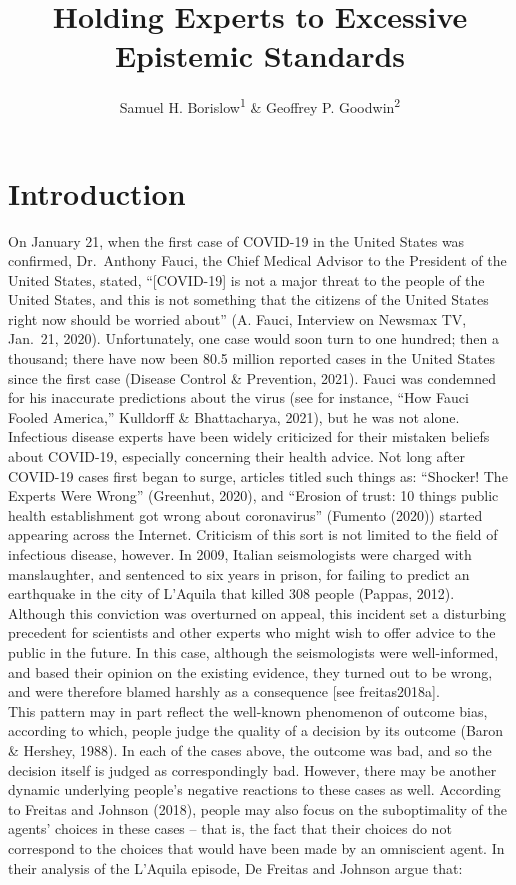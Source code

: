 \documentclass[
  man,floatsintext]{apa6}
\title{Holding Experts to Excessive Epistemic Standards}
\author{Samuel H. Borislow\textsuperscript{1} \& Geoffrey P. Goodwin\textsuperscript{2}}
\date{}
\affiliation{\vspace{0.5cm}\textsuperscript{1} University of Chicago\\\textsuperscript{2} University of Pennsylvania}
\begin{document}
\maketitle

\setlength{\skip\footins}{18pt}

\hypertarget{introduction}{%
\section{Introduction}\label{introduction}}

On January 21, when the first case of COVID-19 in the United States was confirmed, Dr.~Anthony Fauci, the Chief Medical Advisor to the President of the United States, stated, ``{[}COVID-19{]} is not a major threat to the people of the United States, and this is not something that the citizens of the United States right now should be worried about'' (A. Fauci, Interview on Newsmax TV, Jan.~21, 2020). Unfortunately, one case would soon turn to one hundred; then a thousand; there have now been 80.5 million reported cases in the United States since the first case (Disease Control \& Prevention, 2021). Fauci was condemned for his inaccurate predictions about the virus (see for instance, ``How Fauci Fooled America,'' Kulldorff \& Bhattacharya, 2021), but he was not alone. Infectious disease experts have been widely criticized for their mistaken beliefs about COVID-19, especially concerning their health advice. Not long after COVID-19 cases first began to surge, articles titled such things as: ``Shocker! The Experts Were Wrong'' (Greenhut, 2020), and ``Erosion of trust: 10 things public health establishment got wrong about coronavirus'' (Fumento (2020)) started appearing across the Internet. Criticism of this sort is not limited to the field of infectious disease, however. In 2009, Italian seismologists were charged with manslaughter, and sentenced to six years in prison, for failing to predict an earthquake in the city of L'Aquila that killed 308 people (Pappas, 2012). Although this conviction was overturned on appeal, this incident set a disturbing precedent for scientists and other experts who might wish to offer advice to the public in the future. In this case, although the seismologists were well-informed, and based their opinion on the existing evidence, they turned out to be wrong, and were therefore blamed harshly as a consequence {[}see freitas2018a{]}.\\
This pattern may in part reflect the well-known phenomenon of outcome bias, according to which, people judge the quality of a decision by its outcome (Baron \& Hershey, 1988). In each of the cases above, the outcome was bad, and so the decision itself is judged as correspondingly bad. However, there may be another dynamic underlying people's negative reactions to these cases as well. According to Freitas and Johnson (2018), people may also focus on the suboptimality of the agents' choices in these cases -- that is, the fact that their choices do not correspond to the choices that would have been made by an omniscient agent. In their analysis of the L'Aquila episode, De Freitas and Johnson argue that:\\
\end{document}
